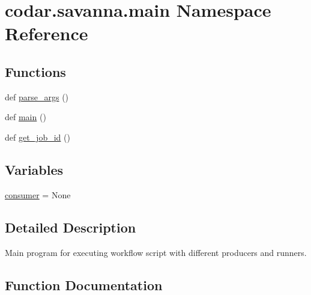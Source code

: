 \hypertarget{namespacecodar_1_1savanna_1_1main}{}\section{codar.\+savanna.\+main Namespace Reference}
\label{namespacecodar_1_1savanna_1_1main}
\subsection*{Functions}
\begin{DoxyCompactItemize}
\item 
def \hyperlink{namespacecodar_1_1savanna_1_1main_a09ab91d19cb193d6d01e65d3f415ec22}{parse\+\_\+args} ()
\item 
def \hyperlink{namespacecodar_1_1savanna_1_1main_ab5690a0c0dfa679e7b43175a365b5a81}{main} ()
\item 
def \hyperlink{namespacecodar_1_1savanna_1_1main_a744cfd54425208a09aa9aa31c4bce655}{get\+\_\+job\+\_\+id} ()
\end{DoxyCompactItemize}
\subsection*{Variables}
\begin{DoxyCompactItemize}
\item 
\hyperlink{namespacecodar_1_1savanna_1_1main_a12ce430b046def16041cbc8435c43dbc}{consumer} = None
\end{DoxyCompactItemize}


\subsection{Detailed Description}
\begin{DoxyVerb}Main program for executing workflow script with different producers and
runners.\end{DoxyVerb}
 

\subsection{Function Documentation}
\mbox{\label{namespacecodar_1_1savanna_1_1main_a744cfd54425208a09aa9aa31c4bce655}} 
